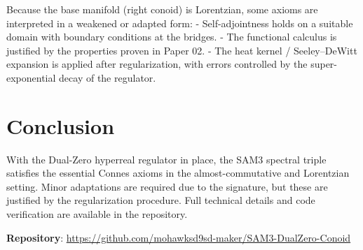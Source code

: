 \documentclass[11pt,a4paper]{article}
\begin{document}
Because the base manifold (right conoid) is Lorentzian, some axioms are interpreted in a weakened or adapted form:
- Self-adjointness holds on a suitable domain with boundary conditions at the bridges.
- The functional calculus is justified by the properties proven in Paper 02.
- The heat kernel / Seeley–DeWitt expansion is applied after regularization, with errors controlled by the super-exponential decay of the regulator.

\section{Conclusion}

With the Dual-Zero hyperreal regulator in place, the SAM3 spectral triple satisfies the essential Connes axioms in the almost-commutative and Lorentzian setting. Minor adaptations are required due to the signature, but these are justified by the regularization procedure. Full technical details and code verification are available in the repository.

\vspace{1em}
\textbf{Repository}: \url{https://github.com/mohawksd9sd-maker/SAM3-DualZero-Conoid}
\end{document}
